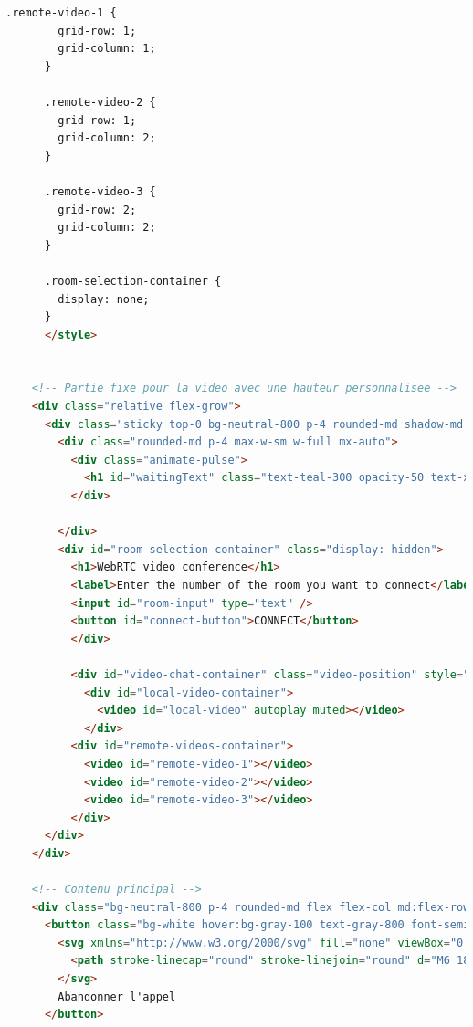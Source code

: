 \documentclass[12pt, a4paper, oneside]{thesis}
\begin{document}
\begin{lstlisting}[language=HTML, caption={Page - Réunions}, label=Page - Reunions]
      .remote-video-1 {
        grid-row: 1;
        grid-column: 1;
      }
    
      .remote-video-2 {
        grid-row: 1;
        grid-column: 2;
      }
    
      .remote-video-3 {
        grid-row: 2;
        grid-column: 2;
      }
  
      .room-selection-container {
        display: none;
      }
      </style>
  
  
    <!-- Partie fixe pour la video avec une hauteur personnalisee -->
    <div class="relative flex-grow">
      <div class="sticky top-0 bg-neutral-800 p-4 rounded-md shadow-md h-16 my-8 min-h-[300px] flex items-center justify-center">
        <div class="rounded-md p-4 max-w-sm w-full mx-auto">
          <div class="animate-pulse">
            <h1 id="waitingText" class="text-teal-300 opacity-50 text-xl text-center">En attente de la connexion a la reunion</h1>
          </div>
  
        </div>
        <div id="room-selection-container" class="display: hidden">
          <h1>WebRTC video conference</h1>
          <label>Enter the number of the room you want to connect</label>
          <input id="room-input" type="text" />
          <button id="connect-button">CONNECT</button>
          </div>
        
          <div id="video-chat-container" class="video-position" style="display: none">
            <div id="local-video-container">
              <video id="local-video" autoplay muted></video>
            </div>
          <div id="remote-videos-container">
            <video id="remote-video-1"></video>
            <video id="remote-video-2"></video>
            <video id="remote-video-3"></video>
          </div>
      </div>
    </div>
  
    <!-- Contenu principal -->
    <div class="bg-neutral-800 p-4 rounded-md flex flex-col md:flex-row justify-center items-center space-y-4 md:space-y-0 md:space-x-8" data-astro-cid-j7pv25f6="">
      <button class="bg-white hover:bg-gray-100 text-gray-800 font-semibold py-2 px-4 border border-gray-400 rounded shadow flex items-center" id="hangup-button" data-astro-cid-j7pv25f6="">
        <svg xmlns="http://www.w3.org/2000/svg" fill="none" viewBox="0 0 24 24" stroke-width="1.5" stroke="currentColor" class="w-6 h-6 mr-2" data-astro-cid-j7pv25f6="">
          <path stroke-linecap="round" stroke-linejoin="round" d="M6 18L18 6M6 6l12 12" data-astro-cid-j7pv25f6=""></path>
        </svg>
        Abandonner l'appel
      </button>
    

\end{lstlisting}
\end{document}
